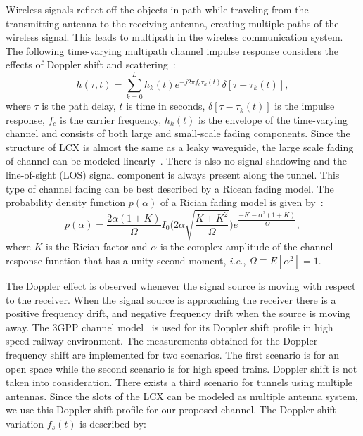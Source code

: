 Wireless signals reflect off the objects in path while traveling from the transmitting antenna to the receiving antenna, creating multiple paths of the wireless signal. This leads to multipath in the wireless communication system. The following time-varying multipath channel impulse response considers the effects of Doppler shift and scattering~\cite{booklter13}:
\begin{equation}
\label{channel}
{h}(\tau,t)= \sum_{k=0}^{L}{h_k}(t)e^{-j2\pi f_c\tau_k(t)}\delta[\tau-\tau_k(t)],
\end{equation}
where $\tau$ is the path delay, $t$ is time in seconds, $\delta[\tau-\tau_k(t)]$ is the impulse response, $f_c$ is the carrier frequency, $h_k(t)$ is the envelope of the time-varying channel and consists of both large and small-scale fading components. Since the structure of LCX is almost the same as a leaky waveguide, the large scale fading of channel can be modeled linearly~\cite{arlter10}. There is also no signal shadowing and the line-of-sight (LOS) signal component is always present along the tunnel. This type of channel fading can be best described by a Ricean fading model. The probability density function $p(\alpha)$ of a Rician fading model is given by~\cite{inplter12}:
\begin{equation}
p(\alpha) = \dfrac{2\alpha(1+K)}{\Omega}I_0\Bigg(2\alpha\sqrt{\dfrac{K+K^2}{\Omega}}\Bigg)e^{\dfrac{-K-\alpha^2(1+K)}{\Omega}},
\end{equation}
where $K$ is the Rician factor and $\alpha$ is the complex amplitude of the channel response function that has a unity second moment, \textit{i.e.}, $\Omega \equiv E[\alpha^2] = 1$.

The Doppler effect is observed whenever the signal source is moving with respect to the receiver. When the signal source is approaching the receiver there is a positive frequency drift, and negative frequency drift when the source is moving away. The 3GPP channel model~\cite{trlter14} is used for its Doppler shift profile in high speed railway environment. The measurements obtained for the Doppler frequency shift are implemented for two scenarios. The first scenario is for an open space while the second scenario is for high speed trains. Doppler shift is not taken into consideration. There exists a third scenario for tunnels using multiple antennas. Since the slots of the LCX can be modeled as multiple antenna system, we use this Doppler shift profile for our proposed channel. The Doppler shift variation $f_s(t)$ is described by:

